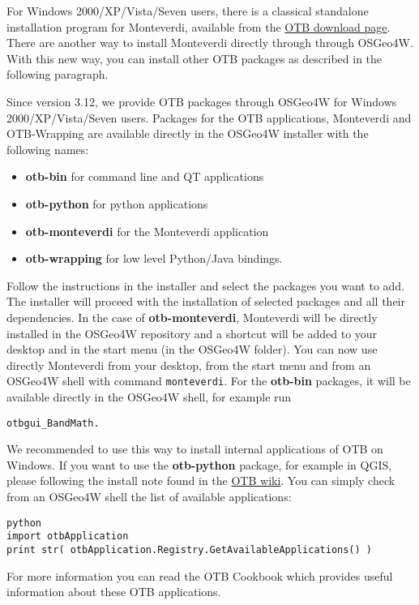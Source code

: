 For Windows 2000/XP/Vista/Seven users, there is a classical standalone installation program for Monteverdi, available from the
\href{http://sourceforge.net/projects/orfeo-toolbox/}{OTB download page}. There are another way to install Monteverdi directly through through OSGeo4W. With this new way, you can install other OTB packages as described in the following paragraph.

Since version 3.12, we provide OTB packages through OSGeo4W for Windows 2000/XP/Vista/Seven users. Packages for the OTB applications, Monteverdi and
OTB-Wrapping are available directly in the OSGeo4W installer with the following names:
\begin{itemize}
\item \textbf{otb-bin} for command line and QT applications
\item \textbf{otb-python} for python applications
\item \textbf{otb-monteverdi} for the Monteverdi application
\item \textbf{otb-wrapping} for low level Python/Java bindings.
\end{itemize}
Follow the instructions in the installer and select the packages you want to add. The installer will proceed with the installation of selected packages and all their dependencies.
In the case of \textbf{otb-monteverdi}, Monteverdi will be directly installed in the OSGeo4W repository and a shortcut will be added to your desktop
and in the start menu (in the OSGeo4W folder). You can now use directly Monteverdi from your desktop, from the start menu and from an OSGeo4W shell with command \texttt{monteverdi}.
For the \textbf{otb-bin} packages, it will be available directly in the OSGeo4W shell, for example run
\begin{verbatim}
otbgui_BandMath.
\end{verbatim}
 We recommended to use this way to install internal applications of OTB on Windows.
If you want to use the \textbf{otb-python} package, for example in QGIS, please following the install note found in the \href{http://wiki.orfeo-toolbox.org/index.php/Quantum_GIS_access_to_OTB_applications#Notes_for_Windows_users}{OTB wiki}. You can simply check from an OSGeo4W shell the list of available applications:
\begin{verbatim}
python
import otbApplication
print str( otbApplication.Registry.GetAvailableApplications() )
\end{verbatim}
For more information you can read the OTB Cookbook which provides useful information about these OTB applications.

